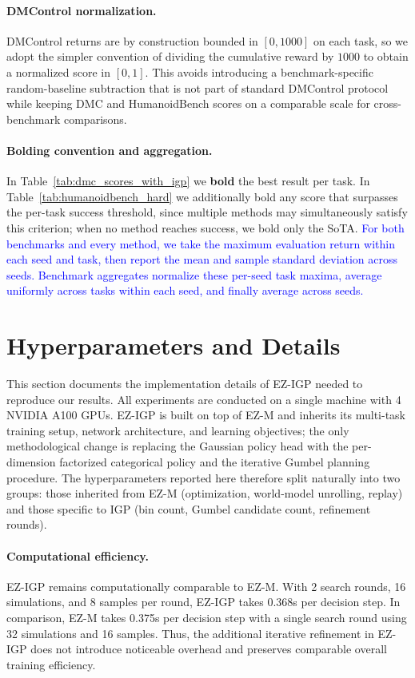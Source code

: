 \paragraph{DMControl normalization.} DMControl returns are by construction bounded in $[0, 1000]$ on each task, so we adopt the simpler convention of dividing the cumulative reward by $1000$ to obtain a normalized score in $[0, 1]$. This avoids introducing a benchmark-specific random-baseline subtraction that is not part of standard DMControl protocol while keeping DMC and HumanoidBench scores on a comparable scale for cross-benchmark comparisons.

\paragraph{Bolding convention and aggregation.} In Table~\ref{tab:dmc_scores_with_igp} we \textbf{bold} the best result per task. In Table~\ref{tab:humanoidbench_hard} we additionally bold any score that surpasses the per-task success threshold, since multiple methods may simultaneously satisfy this criterion; when no method reaches success, we bold only the SoTA. \textcolor{blue}{For both benchmarks and every method, we take the maximum evaluation return within each seed and task, then report the mean and sample standard deviation across seeds. Benchmark aggregates normalize these per-seed task maxima, average uniformly across tasks within each seed, and finally average across seeds.}


\newpage
\section{Hyperparameters and Details}
\label{app:hyperparameters}

This section documents the implementation details of EZ-IGP needed to reproduce our results. All experiments are conducted on a single machine with 4 NVIDIA A100 GPUs. EZ-IGP is built on top of EZ-M and inherits its multi-task training setup, network architecture, and learning objectives; the only methodological change is replacing the Gaussian policy head with the per-dimension factorized categorical policy and the iterative Gumbel planning procedure. The hyperparameters reported here therefore split naturally into two groups: those inherited from EZ-M (optimization, world-model unrolling, replay) and those specific to IGP (bin count, Gumbel candidate count, refinement rounds).

\paragraph{Computational efficiency.}
EZ-IGP remains computationally comparable to EZ-M. With 2 search rounds, 16 simulations, and 8 samples per round, EZ-IGP takes 0.368s per decision step. In comparison, EZ-M takes 0.375s per decision step with a single search round using 32 simulations and 16 samples. Thus, the additional iterative refinement in EZ-IGP does not introduce noticeable overhead and preserves comparable overall training efficiency.


